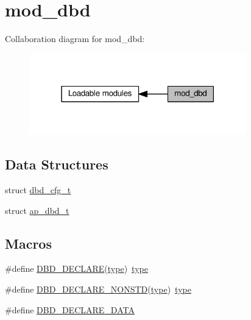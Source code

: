 \hypertarget{group__MOD__DBD}{}\section{mod\+\_\+dbd}
\label{group__MOD__DBD}
Collaboration diagram for mod\+\_\+dbd\+:
\nopagebreak
\begin{figure}[H]
\begin{center}
\leavevmode
\includegraphics[width=267pt]{group__MOD__DBD}
\end{center}
\end{figure}
\subsection*{Data Structures}
\begin{DoxyCompactItemize}
\item 
struct \hyperlink{structdbd__cfg__t}{dbd\+\_\+cfg\+\_\+t}
\item 
struct \hyperlink{structap__dbd__t}{ap\+\_\+dbd\+\_\+t}
\end{DoxyCompactItemize}
\subsection*{Macros}
\begin{DoxyCompactItemize}
\item 
\#define \hyperlink{group__MOD__DBD_ga58b7d7d5072a95558c80d7970af42bf4}{D\+B\+D\+\_\+\+D\+E\+C\+L\+A\+RE}(\hyperlink{pcre_8txt_a2463fbbe8b0c90b90db12195e1edaa5d}{type})~\hyperlink{pcre_8txt_a2463fbbe8b0c90b90db12195e1edaa5d}{type}
\item 
\#define \hyperlink{group__MOD__DBD_ga3c19f8be85da1fc18b077fc125817456}{D\+B\+D\+\_\+\+D\+E\+C\+L\+A\+R\+E\+\_\+\+N\+O\+N\+S\+TD}(\hyperlink{pcre_8txt_a2463fbbe8b0c90b90db12195e1edaa5d}{type})~\hyperlink{pcre_8txt_a2463fbbe8b0c90b90db12195e1edaa5d}{type}
\item 
\#define \hyperlink{group__MOD__DBD_ga139aa42efef666b3734aacacbaa739d9}{D\+B\+D\+\_\+\+D\+E\+C\+L\+A\+R\+E\+\_\+\+D\+A\+TA}
\end{DoxyCompactItemize}
